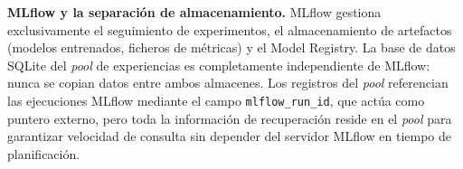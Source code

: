 \textbf{MLflow y la separación de almacenamiento.} MLflow gestiona exclusivamente el seguimiento de experimentos, el almacenamiento de artefactos (modelos entrenados, ficheros de métricas) y el Model Registry. La base de datos SQLite del \emph{pool} de experiencias es completamente independiente de MLflow: nunca se copian datos entre ambos almacenes. Los registros del \emph{pool} referencian las ejecuciones MLflow mediante el campo \texttt{mlflow\_run\_id}, que actúa como puntero externo, pero toda la información de recuperación reside en el \emph{pool} para garantizar velocidad de consulta sin depender del servidor MLflow en tiempo de planificación.
